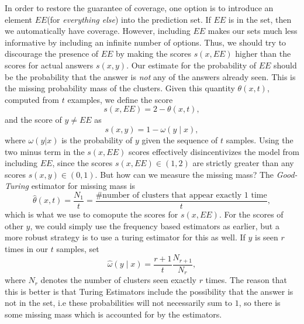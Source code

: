 \documentclass{scrartcl}
\begin{document}
In order to restore the guarantee of coverage, one option is to introduce an element $EE$(for \emph{everything else}) into the prediction set. If $EE$ is in the set, then we automatically have coverage. However, including $EE$ makes our sets much less informative by including an infinite number of options. Thus, we should try to discourage the presence of $EE$ by making the scores $s(x, EE)$ higher than the scores for actual answers $s(x, y)$. Our estimate for the probability of $EE$ should be the probability that the answer is \emph{not} any of the answers already seen. This is the missing probability mass of the clusters. Given this quantity $\theta(x, t)$, computed from $t$ examples, we define the score
\[ s(x, EE) = 2 - \theta(x, t) , \]
and the score of $y \neq EE$ as 
\[ s(x, y) = 1 - \omega(y \mid  x) , \]
where $\omega(y | x)$ is the probability of $y$ given the sequence of $t$ samples. 
Using the two minus term in the $s(x, EE)$ scores effectively disincentivizes the model from including $EE$, since the scores $s(x, EE) \in (1, 2)$ are strictly greater than any scores $s(x, y) \in (0, 1)$.
But how can we measure the missing mass? The \emph{Good-Turing} estimator for missing mass is 
\[ \hat{\theta}(x, t) = \frac{N_1}{t} = \frac{\text{\# number of clusters that appear exactly $1$ time}}{t} , \]
which is what we use to comopute the scores for $s(x, EE)$. For the scores of other $y$, we could simply use the frequency based estimators as earlier, but a more robust strategy is to use a turing estimator for this as well. If $y$ is seen $r$ times in our $t$ samples, set
\[ \hat{\omega}(y \mid x)  = \frac{r + 1}{t} \frac{N_{r + 1}}{N_r} , \]
where $N_r$ denotes the number of clusters seen exactly $r$ times. The reason that this is better is that Turing Estimators include the possibility that the answer is not in the set, i.e these probabilities will not necessarily sum to $1$, so there is some missing mass which is accounted for by the estimators. \medskip
\end{document}
